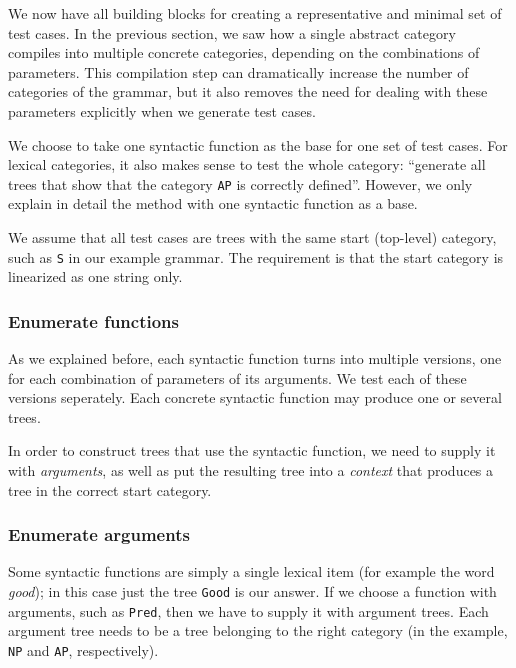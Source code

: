 \documentclass[runningheads]{llncs}
\def\t#1{\texttt{#1}}
\begin{document}
We now have all building blocks for creating a representative and
minimal set of test cases.
In the previous section, we saw how a single abstract category
compiles into multiple concrete categories, depending on the
combinations of parameters. This compilation step can dramatically
increase the number of categories of the grammar, but it also removes
the need for dealing with these parameters explicitly when we generate
test cases. 

We choose to take one syntactic function as the base for one set of
test cases. For lexical categories, it also makes sense to
test the whole category: ``generate all trees that show that the
category \t{AP} is correctly defined''. However, we only explain in
detail the method with one syntactic function as a base.




We assume that all test cases are trees with the same start
(top-level) category, such as \t{S} in our example grammar. The
requirement is that the start category is linearized as one string only. 

\subsubsection{Enumerate functions} As we explained before, each syntactic
function turns into multiple versions, one for each combination of
parameters of its arguments. We test each of these versions
seperately. Each concrete syntactic function may produce one or several trees.

In order to construct trees that use the syntactic function, we need
to supply it with \emph{arguments}, as well as put the resulting tree
into a \emph{context} that produces a tree in the correct start
category.

\subsubsection{Enumerate arguments} Some syntactic functions are
simply a single lexical item (for example the word \emph{good}); in
this case just the tree \t{Good} is our answer.
If we choose a function with arguments, such as \t{Pred}, then we have
to supply it with argument trees. Each argument tree needs to be a
tree belonging to the right category (in the example, \t{NP} and
\t{AP}, respectively). 
\end{document}
